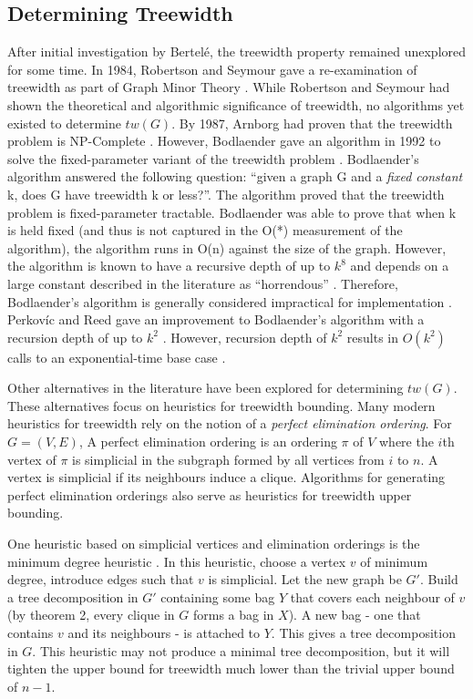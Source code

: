 \documentclass[12pt,conference]{IEEEtran}
\theoremstyle{plain}
\begin{document}
\subsection{Determining Treewidth}

After initial investigation by Bertel\'e, the treewidth property remained unexplored for some time. In 1984, Robertson and Seymour gave a re-examination of treewidth as part of Graph Minor Theory \cite{treewidth-rob-seymour}. While Robertson and Seymour had shown the theoretical and algorithmic significance of treewidth, no algorithms yet existed to determine $tw(G)$. By 1987, Arnborg had proven that the treewidth problem is NP-Complete \cite{arnborg-np-complete}. However, Bodlaender gave an algorithm in 1992 to solve the fixed-parameter variant of the treewidth problem \cite{bodlaender-1992}. Bodlaender's algorithm answered the following question: ``given a graph G and a \textit{fixed constant} k, does G have treewidth k or less?''. The algorithm proved that the treewidth problem is fixed-parameter tractable. Bodlaender was able to prove that when k is held fixed (and thus is not captured in the O(*) measurement of the algorithm), the algorithm runs in O(n) against the size of the graph. However, the algorithm is known to have a recursive depth of up to $k^{8}$ and depends on a large constant described in the literature as ``horrendous'' \cite{tw-alg-analysis}. Therefore, Bodlaender's algorithm is generally considered impractical for implementation \cite{fellows-on-bodlaender}. Perkov\'ic and Reed gave an improvement to Bodlaender's algorithm with a recursion depth of up to $k^{2}$ \cite{reed-tw-improvement}. However, recursion depth of $k^{2}$ results in $O(k^{2})$ calls to an exponential-time base case \cite{tw-alg-analysis}.

Other alternatives in the literature have been explored for determining $tw(G)$. These alternatives focus on heuristics for treewidth bounding. Many modern heuristics for treewidth rely on the notion of a \textit{perfect elimination ordering}. For $G=(V,E)$, A perfect elimination ordering is an ordering $\pi$ of $V$ where the $i$th vertex of $\pi$ is simplicial in the subgraph formed by all vertices from $i$ to $n$. A vertex is simplicial if its neighbours induce a clique. Algorithms for generating perfect elimination orderings also serve as heuristics for treewidth upper bounding. 

One heuristic based on simplicial vertices and elimination orderings is the minimum degree heuristic \cite{min-degree-upper-bound}. In this heuristic, choose a vertex $v$ of minimum degree, introduce edges such that $v$ is simplicial. Let the new graph be $G'$. Build a tree decomposition in $G'$ containing some bag $Y$ that covers each neighbour of $v$ (by theorem 2, every clique in $G$ forms a bag in $X$). A new bag - one that contains $v$ and its neighbours - is attached to $Y$. This gives a tree decomposition in $G$. This heuristic may not produce a minimal tree decomposition, but it will tighten the upper bound for treewidth much lower than the trivial upper bound of $n-1$.
\end{document}

